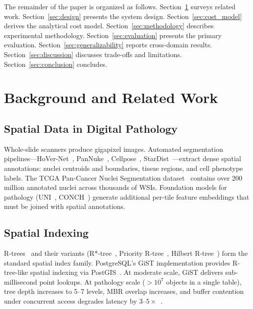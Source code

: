 \documentclass[sigconf]{acmart}
\begin{document}
The remainder of the paper is organized as follows.
Section~\ref{sec:background} surveys related work.
Section~\ref{sec:design} presents the system design.
Section~\ref{sec:cost_model} derives the analytical cost model.
Section~\ref{sec:methodology} describes experimental methodology.
Section~\ref{sec:evaluation} presents the primary evaluation.
Section~\ref{sec:generalizability} reports cross-domain results.
Section~\ref{sec:discussion} discusses trade-offs and limitations.
Section~\ref{sec:conclusion} concludes.

\section{Background and Related Work}
\label{sec:background}

\subsection{Spatial Data in Digital Pathology}

Whole-slide scanners produce gigapixel images.
Automated segmentation pipelines---HoVer-Net~\cite{graham2019hover}, PanNuke~\cite{gamper2020pannuke}, Cellpose~\cite{stringer2021cellpose}, StarDist~\cite{schmidt2018cell}---extract dense spatial annotations: nuclei centroids and boundaries, tissue regions, and cell phenotype labels.
The TCGA Pan-Cancer Nuclei Segmentation dataset~\cite{saltz2018spatial} contains over 200 million annotated nuclei across thousands of WSIs.
Foundation models for pathology (UNI~\cite{chen2024uni}, CONCH~\cite{lu2024conch}) generate additional per-tile feature embeddings that must be joined with spatial annotations.

\subsection{Spatial Indexing}

R-trees~\cite{guttman1984r} and their variants (R*-tree~\cite{beckmann1990r}, Priority R-tree~\cite{arge2004optimal}, Hilbert R-tree~\cite{kamel1994hilbert}) form the standard spatial index family.
PostgreSQL's GiST implementation provides R-tree-like spatial indexing via PostGIS~\cite{postgis2023}.
At moderate scale, GiST delivers sub-millisecond point lookups.
At pathology scale ($>10^7$ objects in a single table), tree depth increases to 5--7 levels, MBR overlap increases, and buffer contention under concurrent access degrades latency by $3$--$5\times$~\cite{leutenegger1997str}.
\end{document}
